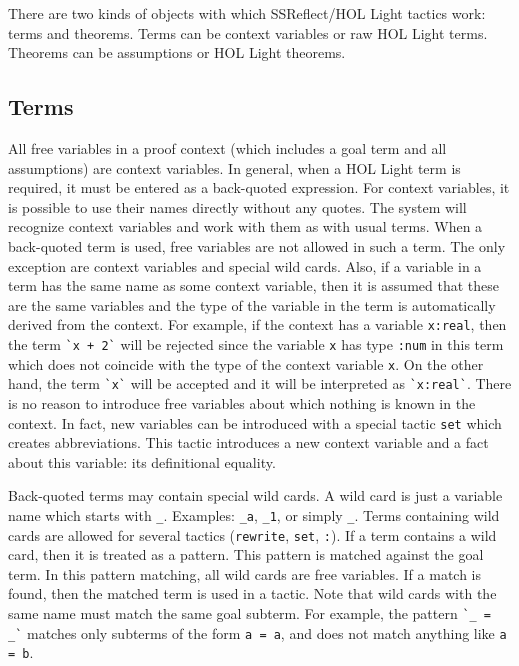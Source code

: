 \documentclass[a4paper]{article}
\begin{document}
There are two kinds of objects with which SSReflect/HOL Light tactics work: terms and theorems. Terms can be context variables or raw HOL Light terms. Theorems can be assumptions or HOL Light theorems.

\subsection{Terms}
All free variables in a proof context (which includes a goal term and all assumptions) are context variables. In general, when a HOL Light term is required, it must be entered as a back-quoted expression. For context variables, it is possible to use their names directly without any quotes. The system will recognize context variables and work with them as with usual terms. When a back-quoted term is used, free variables are not allowed in such a term. The only exception are context variables and special wild cards. Also, if a variable in a term has the same name as some context variable, then it is assumed that these are the same variables and the type of the variable in the term is automatically derived from the context. For example, if the context has a variable \verb|x:real|, then the term \verb|`x + 2`| will be rejected since the variable \verb|x| has type \verb|:num| in this term which does not coincide with the type of the context variable \verb|x|. On the other hand, the term \verb|`x`| will be accepted and it will be interpreted as \verb|`x:real`|. There is no reason to introduce free variables about which nothing is known in the context. In fact, new variables can be introduced with a special tactic \verb|set| which creates abbreviations. This tactic introduces a new context variable and a fact about this variable: its definitional equality.

Back-quoted terms may contain special wild cards. A wild card is just a variable name which starts with \verb|_|. Examples: \verb|_a|, \verb|_1|, or simply \verb|_|. Terms containing wild cards are allowed for several tactics (\verb|rewrite|, \verb|set|, \verb|:|). If a term contains a wild card, then it is treated as a pattern. This pattern is matched against the goal term. In this pattern matching, all wild cards are free variables. If a match is found, then the matched term is used in a tactic. Note that wild cards with the same name must match the same goal subterm. For example, the pattern \verb|`_ = _`| matches only subterms of the form \verb|a = a|, and does not match anything like \verb|a = b|.


\end{document}
